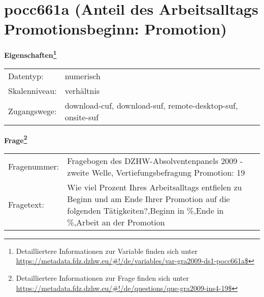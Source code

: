 
    \setcounter{footnote}{0}

    \vspace*{-1.8cm}
	\section{pocc661a (Anteil des Arbeitsalltags Promotionsbeginn: Promotion)}
	\label{section:pocc661a}



    \vspace*{0.5cm}
    \noindent\textbf{Eigenschaften\footnote{Detailliertere Informationen zur Variable finden sich unter
		\url{https://metadata.fdz.dzhw.eu/\#!/de/variables/var-gra2009-ds1-pocc661a$}}}\\
	\begin{tabularx}{\hsize}{@{}lX}
	Datentyp: & numerisch \\
	Skalenniveau: & verhältnis \\
	Zugangswege: &
	  download-cuf, 
	  download-suf, 
	  remote-desktop-suf, 
	  onsite-suf
 \\
    \end{tabularx}



				\vspace*{0.5cm}
                \noindent\textbf{Frage\footnote{Detailliertere Informationen zur Frage finden sich unter
		              \url{https://metadata.fdz.dzhw.eu/\#!/de/questions/que-gra2009-ins4-19$}}}\\
				\begin{tabularx}{\hsize}{@{}lX}
					Fragenummer: &
					  Fragebogen des DZHW-Absolventenpanels 2009 - zweite Welle, Vertiefungsbefragung Promotion:
					  19
 \\
					Fragetext: & Wie viel Prozent Ihres Arbeitsalltags entfielen zu Beginn und am Ende Ihrer Promotion auf die folgenden Tätigkeiten?,Beginn in \%,Ende in \%,Arbeit an der Promotion \\
				\end{tabularx}





